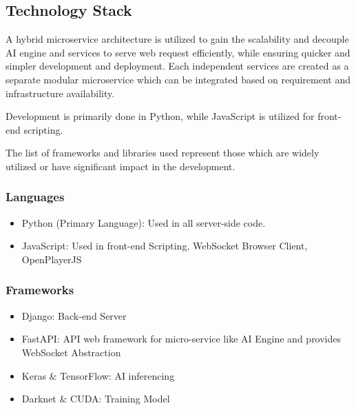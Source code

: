 \subsection*{Technology Stack}
A hybrid microservice architecture is utilized to gain the scalability and decouple AI engine and services to serve web request efficiently, while ensuring quicker and simpler development and deployment. Each independent services are created as a separate modular microservice which can be integrated based on requirement and infrastructure availability.

Development is primarily done in Python, while JavaScript is utilized for front-end scripting.

The list of frameworks and libraries used represent those which are widely utilized or have significant impact in the development.

\subsubsection*{Languages}
\begin{itemize}
	\item Python (Primary Language): Used in all server-side code.
	\item JavaScript: Used in front-end Scripting, WebSocket Browser Client, OpenPlayerJS
\end{itemize}

\subsubsection*{Frameworks}
\begin{itemize}
	\item Django: Back-end Server
	\item FastAPI: API web framework for micro-service like AI Engine and provides WebSocket Abstraction
	\item Keras \& TensorFlow: AI inferencing
	\item Darknet \& CUDA: Training Model
\end{itemize}

